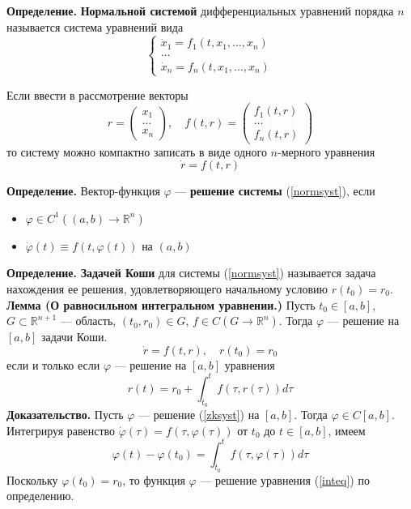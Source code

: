 \textbf{Определение.} \textbf{Нормальной системой} дифференциальных уравнений порядка $n$ называется система уравнений вида
\begin{equation*}
    \begin{cases}
    \dot{x}_1 = f_1(t, x_1,\ldots,x_n)\\
    \ldots\\
    \dot{x}_n = f_n(t, x_1, \ldots, x_n)
    \end{cases}
\end{equation*}

Если ввести в рассмотрение векторы
\begin{equation*}
    r = \begin{pmatrix}
    x_1\\
    \ldots\\
    x_n
    \end{pmatrix}, \quad
    f(t,r) = \begin{pmatrix}
        f_1(t,r)\\
        \ldots\\
        f_n(t,r)
    \end{pmatrix}
\end{equation*}
то систему можно компактно записать в виде одного $n$-мерного уравнения
\begin{equation}
    \dot{r} = f(t,r) \label{normsyst}
\end{equation}

\noindent \textbf{Определение.} Вектор-функция $\varphi$ --- \textbf{решение системы} (\ref{normsyst}), если
\begin{itemize}
    \item $\varphi \in C^1((a,b) \to \mathbb{R}^n)$
    \item $\dot{\varphi}(t) \equiv f(t, \varphi(t))$ на $(a,b)$
\end{itemize}

\noindent \textbf{Определение.} \textbf{Задачей Коши} для системы (\ref{normsyst}) называется задача нахождения ее решения, удовлетворяющего начальному условию $r(t_0) = r_0$.\\

\noindent \textbf{Лемма (О равносильном интегральном уравнении.)} Пусть $t_0 \in [a,b]$, $G \subset \mathbb{R}^{n + 1}$ --- область, $(t_0, r_0) \in G$, $f \in C(G \to \mathbb{R}^n)$. Тогда $\varphi$ --- решение на $[a,b]$ задачи Коши.
\begin{equation}
    \dot{r} = f(t,r), \quad r(t_0)=r_0 \label{zksyst}
\end{equation}
если и только если $\varphi$ --- решение на $[a,b]$ уравнения
\begin{equation}
    r(t) = r_0 + \int_{t_0}^{t} f(\tau, r(\tau))d\tau \label{inteq}
\end{equation}
\textbf{Доказательство.} Пусть $\varphi$ --- решение (\ref{zksyst}) на $[a,b]$. Тогда $\varphi \in C[a,b]$. Интегрируя равенство $\dot{\varphi}(\tau) = f(\tau, \varphi(\tau))$ от $t_0$ до $t \in [a,b]$, имеем
\begin{equation*}
    \varphi(t) - \varphi(t_0) = \int_{t_0}^{t} f(\tau, \varphi(\tau))d\tau
\end{equation*}
Поскольку $\varphi(t_0) = r_0$, то функция $\varphi$ --- решение уравнения (\ref{inteq}) по определению.

